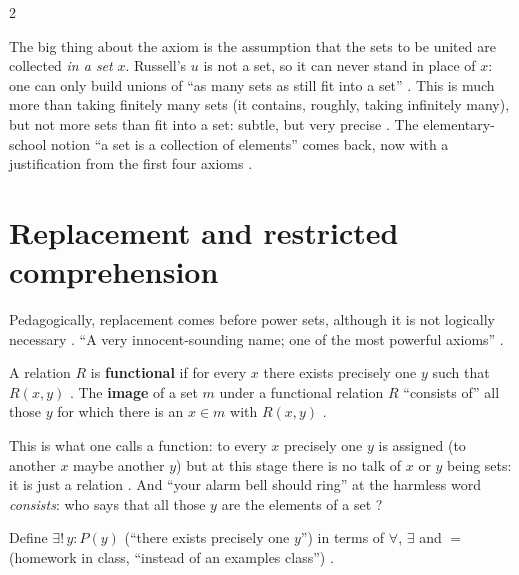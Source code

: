 \begin{paracol}{2}
\begin{intuition}
The big thing about the axiom is the assumption that the sets to be united are collected \emph{in a set} $x$.
Russell's $u$ is not a set, so it can never stand in place of $x$: one can only build unions of ``as many sets as
still fit into a set'' . This is much more than taking finitely many
sets (it contains, roughly, taking infinitely many), but not more sets than fit into a set: subtle, but very
precise . The elementary-school notion ``a set is a collection of elements'' comes back, now with a
justification from the first four axioms .
\end{intuition}

\section{Replacement and restricted comprehension}\label{sec:se-replacement}

Pedagogically, replacement comes before power sets, although it is not logically necessary
. ``A very innocent-sounding name; one of the most powerful axioms'' .

\begin{definition}\label{def:se-functional}
A relation $R$ is \textbf{functional} if for every $x$ there exists precisely one $y$ such that $R(x,y)$
. The \textbf{image} of a set $m$ under a functional relation $R$ ``consists of'' all
those $y$ for which there is an $x\in m$ with $R(x,y)$ .
\end{definition}
This is what one calls a function: to every $x$ precisely one $y$ is assigned (to another $x$ maybe another $y$) but
at this stage there is no talk of $x$ or $y$ being sets: it is just a relation .
And ``your alarm bell should ring'' at the harmless word \emph{consists}: who says that all those $y$ are the
elements of a set ?

\begin{exercise}\label{ex:se-exists-one}
Define $\exists!\,y\colon P(y)$ (``there exists precisely one $y$'') in terms of $\forall$, $\exists$ and $=$
(homework in class, ``instead of an examples class'') .
\end{exercise}


\end{paracol}
